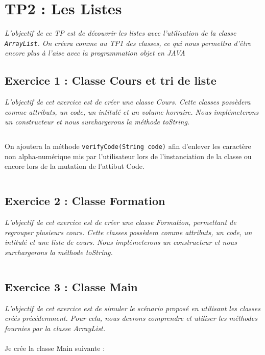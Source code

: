 \chapter{TP2 : Les Listes}
\textit{L'objectif de ce TP est de découvrir les listes avec l'utilisation de la classe \texttt{ArrayList}. On créera comme au TP1 des classes, ce qui nous permettra d'être encore plus à l'aise avec la programmation objet en JAVA}

\section{Exercice 1 : Classe Cours et tri de liste}
\textit{L'objectif de cet exercice est de créer une classe Cours. Cette classes possèdera comme attributs, un code, un intitulé et un volume horraire. Nous implémeterons un constructeur et nous surchargerons la méthode toString.}
\inputminted[linenos,firstline=3,lastline=63]{java}{../sources/src/tp2/Cours.java}

On ajoutera la méthode \texttt{verifyCode(String code)} afin d'enlever les caractère non alpha-numérique mis par l'utilisateur lors de l'instanciation de la classe ou encore lors de la mutation de l'attibut Code.
\inputminted[linenos,firstline=65,lastline=68]{java}{../sources/src/tp2/Cours.java}

\section{Exercice 2 : Classe Formation}
\textit{L'objectif de cet exercice est de créer une classe Formation, permettant de regrouper plusieurs cours. Cette classes possèdera comme attributs, un code, un intitulé et une liste de cours. Nous implémeterons un constructeur et nous surchargerons la méthode toString.}
\inputminted[linenos,firstline=5,lastline=66]{java}{../sources/src/tp2/Formation.java}

\section{Exercice 3 : Classe Main}
\textit{L'objectif de cet exercice est de simuler le scénario proposé en utilisant les classes créés précédemment. Pour cela, nous devrons comprendre et utiliser les méthodes fournies par la classe ArrayList.}
\\\\
Je crée la classe Main suivante :
\inputminted[linenos,firstline=3,lastline=46]{java}{../sources/src/tp2/Main.java}

